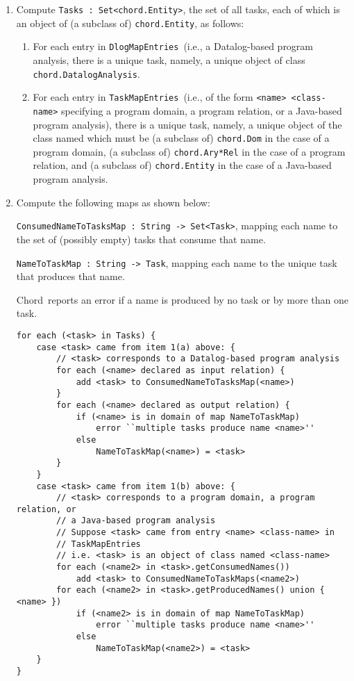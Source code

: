 \documentclass{article}
\providecommand\Chord{{Chord}}
\providecommand\TaskMapEntries{{\tt TaskMapEntries}}
\providecommand\DlogMapEntries{{\tt DlogMapEntries}}
\begin{document}
\begin{enumerate}
\item
Compute {\tt Tasks\ :\ Set<chord.Entity>}, the set of all tasks,
each of which is an object of (a subclass of) {\tt chord.Entity},
as follows:

\begin{enumerate}
\item
For each entry in \DlogMapEntries\ (i.e., a Datalog-based program analysis,
there is a unique task, namely, a unique object of class {\tt chord.DatalogAnalysis}.

\item
For each entry in \TaskMapEntries\ (i.e., of the form {\tt <name> <class-name>} specifying
a program domain, a program relation, or a Java-based program analysis), there is a
unique task, namely, a unique object
of the class named {\tt <class-name>} which must be (a subclass of) {\tt chord.Dom} in the
case of a program domain, (a subclass of) {\tt chord.Ary*Rel} in the case of a
program relation, and (a subclass of) {\tt chord.Entity} in the case of a Java-based
program analysis.
\end{enumerate}

\item
Compute the following maps as shown below:

{\tt ConsumedNameToTasksMap\ :\ String -> Set<Task>},
mapping each name to the set of (possibly empty) tasks that consume that name.

{\tt NameToTaskMap\ :\ String -> Task},
mapping each name to the unique task that produces that name.

\Chord\ reports an error if a name is produced by no task or by more than one task.
{\small 
\begin{verbatim}
for each (<task> in Tasks) {
    case <task> came from item 1(a) above: {
        // <task> corresponds to a Datalog-based program analysis
        for each (<name> declared as input relation) {
            add <task> to ConsumedNameToTasksMap(<name>)
        }
        for each (<name> declared as output relation) {
            if (<name> is in domain of map NameToTaskMap)
                error ``multiple tasks produce name <name>''
            else
                NameToTaskMap(<name>) = <task>
        }
    }
    case <task> came from item 1(b) above: {
        // <task> corresponds to a program domain, a program relation, or
        // a Java-based program analysis
        // Suppose <task> came from entry <name> <class-name> in
        // TaskMapEntries
        // i.e. <task> is an object of class named <class-name>
        for each (<name2> in <task>.getConsumedNames())
            add <task> to ConsumedNameToTaskMaps(<name2>)
        for each (<name2> in <task>.getProducedNames() union { <name> })
            if (<name2> is in domain of map NameToTaskMap)
                error ``multiple tasks produce name <name>''
            else
                NameToTaskMap(<name2>) = <task>
    }
}
\end{verbatim}
}


\end{enumerate}
\end{document}
